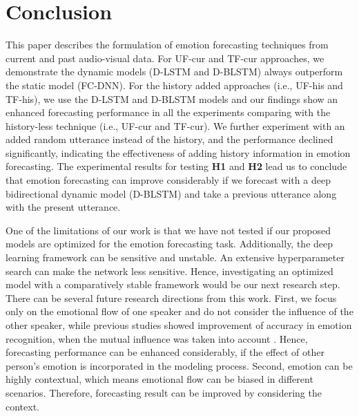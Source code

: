 \chapter{Conclusion} 
This paper describes the formulation of emotion forecasting techniques from current and past audio-visual data. For UF-cur and TF-cur approaches, we demonstrate the dynamic models (D-LSTM and D-BLSTM) always outperform the static model (FC-DNN). For the history added approaches (i.e., UF-his and TF-his), we use the  D-LSTM and D-BLSTM models and our findings show an enhanced forecasting performance in all the experiments comparing with the history-less technique (i.e., UF-cur and TF-cur). We further experiment with an added random utterance instead of the history, and the performance declined significantly, indicating the effectiveness of adding history information in emotion forecasting. The experimental results for testing \textbf{H1} and \textbf{H2} lead us to conclude that emotion forecasting can improve considerably if we forecast with a deep bidirectional dynamic model (D-BLSTM) and take a previous utterance along with the present utterance.

One of the limitations of our work is that we have not tested if our proposed models are optimized for the emotion forecasting task.  Additionally, the deep learning framework can be sensitive and unstable. An extensive hyperparameter search can make the network less sensitive. Hence, investigating an optimized model with a comparatively stable framework would be our next research step. There can be several future research directions from this work. First, we focus only on the emotional flow of one speaker and do not consider the influence of the other speaker, while previous studies showed improvement of accuracy in emotion recognition, when the mutual influence was taken into account \cite{Mutual}. Hence, forecasting performance can be enhanced considerably, if the effect of other person's emotion is incorporated in the modeling process. Second, emotion can be highly contextual, which means emotional flow can be biased in different scenarios. Therefore, forecasting result can be improved by considering the context.


\renewcommand{\bibname}{References}


\backmatter

